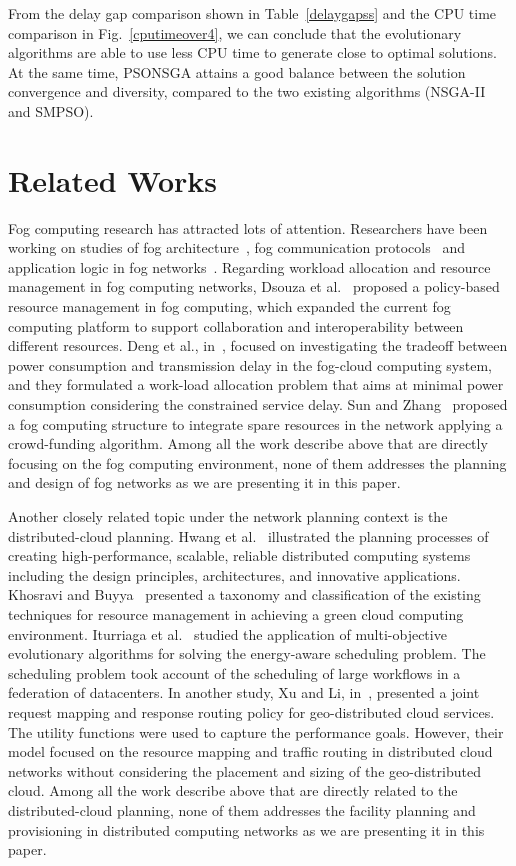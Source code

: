 \documentclass[10pt,journal,compsoc]{IEEEtran}
\newcommand{\Fig}[1]{Fig.~\ref{#1}}
\begin{document}
From the delay gap comparison shown in Table~\ref{delaygapss} and the CPU time comparison in \Fig{cputimeover4}, we can conclude that the evolutionary algorithms are able to use less CPU time to generate close to optimal solutions. At the same time, PSONSGA attains a good balance between the solution convergence and diversity, compared to the two existing algorithms (NSGA-II and SMPSO).


\section{Related Works}\label{relwork}
Fog computing research has attracted lots of attention. Researchers have been working on studies of fog architecture~\cite{fcsmartcity}, fog communication protocols~\cite{Peng:2016:FRA:3029494.3029575} and application logic in fog networks~\cite{SUN2017687}. Regarding workload allocation and resource management in fog computing networks, Dsouza et al.~\cite{secme} proposed a policy-based resource management in fog computing, which expanded the current fog computing platform to support collaboration and interoperability between different resources. Deng et al., in~\cite{fcworkload}, focused on investigating the tradeoff between power consumption and transmission delay in the fog-cloud computing system, and they formulated a work-load allocation problem that aims at minimal power consumption considering the constrained service delay. Sun and Zhang~\cite{SUN2017687} proposed a fog computing structure to integrate spare resources in the network applying a crowd-funding algorithm.
Among all the work describe above that are directly focusing on the fog computing environment, none of them addresses the planning and design of fog networks as we are presenting it in this paper. 

Another closely related topic under the network planning context is the distributed-cloud planning. 
Hwang et al.~\cite{hwang2013distributed} illustrated the planning processes of creating high-performance, scalable, reliable distributed computing systems including the design principles, architectures, and innovative applications. 
Khosravi and Buyya~\cite{enerfoot} presented a taxonomy and classification of the existing techniques for resource management in achieving a green cloud computing environment. 
Iturriaga et al.~\cite{ITOR:ITOR12294} studied the application of multi-objective evolutionary algorithms for solving the energy-aware scheduling problem. The scheduling problem took account of the scheduling of large workflows in a federation of datacenters. In another study, Xu and Li, in~\cite{6566873}, presented a joint request mapping and response routing policy for geo-distributed cloud services. The utility functions were used to capture the performance goals. However, their model focused on the resource mapping and traffic routing in distributed cloud networks without considering the placement and sizing of the geo-distributed cloud. 
Among all the work describe above that are directly related to the distributed-cloud planning, none of them addresses the facility planning and provisioning in distributed computing networks as we are presenting it in this paper.
\end{document}
